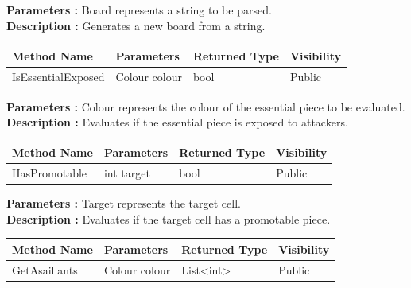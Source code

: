 \documentclass[12pt]{article}
\begin{document}
    \textbf{Parameters :} Board represents a string to be parsed.
    \\

    \textbf{Description :} Generates a new board from a string.

    \begin{table}[H]
        \begin{tabular}{|l|l|l|l|}
            \hline
            \rowcolor[HTML]{EFEFEF}
            \cellcolor[HTML]{EFEFEF}\textbf{Method Name} & \textbf{Parameters} & \textbf{Returned Type} & \textbf{Visibility} \\ \hline
            IsEssentialExposed                           & Colour colour       & bool                   & Public              \\ \hline
        \end{tabular}
    \end{table}

    \textbf{Parameters :} Colour represents the colour of the essential piece to be evaluated.
    \\

    \textbf{Description :} Evaluates if the essential piece is exposed to attackers.

    \begin{table}[H]
        \begin{tabular}{|l|l|l|l|}
            \hline
            \rowcolor[HTML]{EFEFEF}
            \cellcolor[HTML]{EFEFEF}\textbf{Method Name} & \textbf{Parameters} & \textbf{Returned Type} & \textbf{Visibility} \\ \hline
            HasPromotable                                & int target          & bool                   & Public              \\ \hline
        \end{tabular}
    \end{table}

    \textbf{Parameters :} Target represents the target cell.
    \\

    \textbf{Description :} Evaluates if the target cell has a promotable piece.

    \begin{table}[H]
        \begin{tabular}{|l|l|l|l|}
            \hline
            \rowcolor[HTML]{EFEFEF}
            \cellcolor[HTML]{EFEFEF}\textbf{Method Name} & \textbf{Parameters} & \textbf{Returned Type} & \textbf{Visibility} \\ \hline
            GetAsaillants                                & Colour colour       & List\textless{}int\textgreater{} & Public              \\ \hline
        \end{tabular}
    \end{table}
\end{document}
